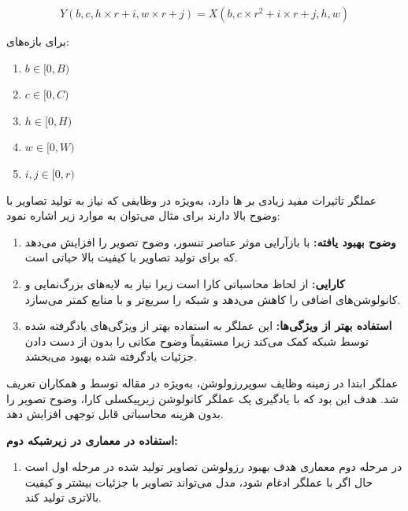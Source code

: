 \begin{enumerate}
\begin{qsolve}
		\begin{equation}
		Y(b, c, h \times r + i, w \times r + j) = X(b, c \times r^2 + i \times r + j, h, w)
		\end{equation}
		
برای بازه‌های:
		\begin{latin}
			\begin{enumerate}
				\item $b \in [0, B)$
				\item $c \in [0, C)$
				\item $h \in [0, H)$
				\item $w \in [0, W)$
				\item $i, j \in [0, r)$
			\end{enumerate} 
		\end{latin}
		
عملگر  تاثیرات مفید زیادی بر ها دارد، به‌ویژه در وظایفی که نیاز به تولید تصاویر با وضوح بالا دارند برای مثال می‌توان به موارد زیر اشاره نمود:
	\end{qsolve}
	
	\begin{qsolve}
		\begin{enumerate}
			\item \textbf{وضوح بهبود یافته:}
با بازآرایی موثر عناصر تنسور،  وضوح تصویر را افزایش می‌دهد که برای تولید تصاویر با کیفیت بالا حیاتی است.
			
			\item \textbf{کارایی:}
 از لحاظ محاسباتی کارا است زیرا نیاز به لایه‌های بزرگ‌نمایی و کانولوشن‌های اضافی را کاهش می‌دهد و شبکه را سریع‌تر و با منابع کمتر می‌سازد.

			
			\item \textbf{استفاده بهتر از ویژگی‌ها:}
این عملگر به استفاده بهتر از ویژگی‌های یادگرفته شده توسط شبکه کمک می‌کند زیرا مستقیماً وضوح مکانی را بدون از دست دادن جزئیات یادگرفته شده بهبود می‌بخشد.
		\end{enumerate}
		

عملگر  ابتدا در زمینه وظایف سوپررزولوشن، به‌ویژه در مقاله 
توسط  و همکاران تعریف شد. هدف این بود که با یادگیری یک عملگر کانولوشن زیرپیکسلی کارا، وضوح تصویر را بدون هزینه محاسباتی قابل توجهی افزایش دهد.


	\textbf{استفاده در معماری  در زیرشبکه دوم: }
	
	\begin{enumerate}
		\item در مرحله دوم معماری  هدف بهبود رزولوشن تصاویر تولید شده در مرحله اول است حال اگر با عملگر  ادغام شود، مدل می‌تواند تصاویر با جزئیات بیشتر و کیفیت بالاتری تولید کند.
		

\end{enumerate}
\end{qsolve}
\end{enumerate}
